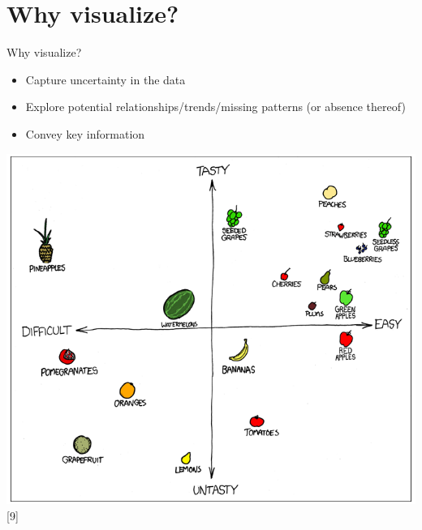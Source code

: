 \section{Why visualize?}
\begin{frame}
	\begin{center}
  		\begin{block}{Why visualize?} 
			\begin{itemize}
				\item \small Capture uncertainty in the data
				\item Explore potential relationships/trends/missing patterns (or absence thereof)
				\item Convey key information \normalfont
			\end{itemize}		
		\end{block}
	\end{center} 

   \begin{center}
     \includegraphics[scale=0.2]{images/xkcd-fuck_grapefruit}[9]
    \end{center}

\end{frame}

